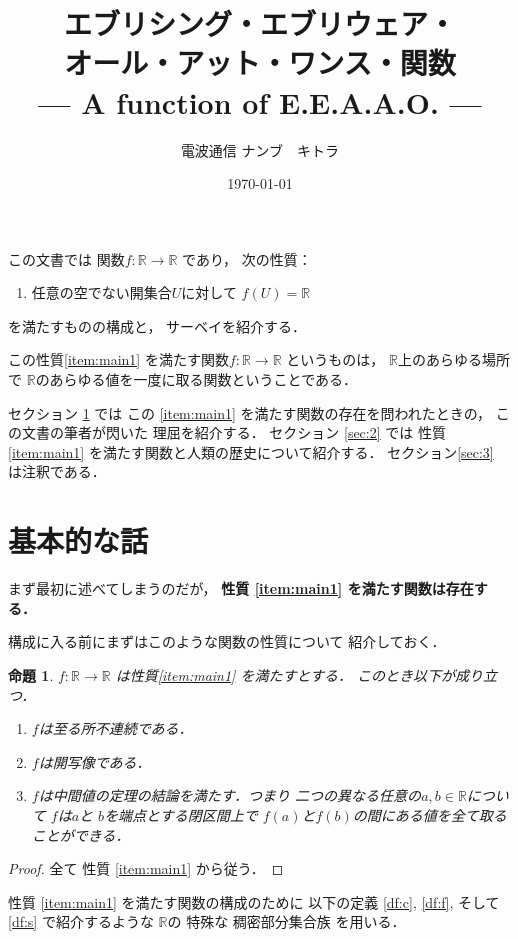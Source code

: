\documentclass[leqno, a4paper, 12pt]{jsarticle}
\title{エブリシング・エブリウェア・\\オール・アット・ワンス・関数
\large{\\--- A function of E.E.A.A.O.  ---}
}
\author{電波通信 ナンブ　キトラ}
\date{\today}
\newtheorem{prop}[thm]{命題}
\theoremstyle{definition}
\newcommand{\rr}{\mathbb{R}}
\newcommand{\mystar}{($\bigstar$)}
\begin{document}
\maketitle

この文書では
関数$f\colon \rr\to \rr$
であり，
次の性質：
\begin{enumerate}[label=\textup{\mystar}]
\item\label{item:main1}
任意の空でない開集合$U$に対して
$f(U)=\rr$
\end{enumerate}
を満たすものの構成と，
サーベイを紹介する．

この性質\ref{item:main1}
を満たす関数$f\colon \rr\to \rr$
というものは，
$\rr$上のあらゆる場所で
$\rr$のあらゆる値を一度に取る関数ということである．


セクション
\ref{sec:1}
では
この
\ref{item:main1}
を満たす関数の存在を問われたときの，
この文書の筆者が閃いた
理屈を紹介する．
セクション
\ref{sec:2}
では
性質\ref{item:main1}
を満たす関数と人類の歴史について紹介する．
セクション\ref{sec:3}
は注釈である．




\section{基本的な話}\label{sec:1}
まず最初に述べてしまうのだが，
\textbf{性質
\ref{item:main1}
を満たす関数は存在する．}

構成に入る前にまずはこのような関数の性質について
紹介しておく．
\begin{prop}\label{prop:basic}
$f\colon \rr\to \rr$
は性質\ref{item:main1}
を満たすとする．
このとき以下が成り立つ．
\begin{enumerate}[label=\textup{(\arabic*)}]
\item 
$f$は至る所不連続である．
\item 
$f$は開写像である．
\item 
$f$は中間値の定理の結論を満たす．つまり
二つの異なる任意の$a, b\in \rr$について
$f$は$a$と
$b$を端点とする閉区間上で
$f(a)$と$f(b)$の間にある値を全て取ることができる．
\end{enumerate}
\end{prop}
\begin{proof}
全て
性質
\ref{item:main1}
から従う．
\end{proof}


性質
\ref{item:main1}
を満たす関数の構成のために
以下の定義
\ref{df:c}, 
\ref{df:f}, 
そして
\ref{df:s}
で紹介するような
$\rr$の
特殊な
稠密部分集合族
を用いる．
\end{document}
